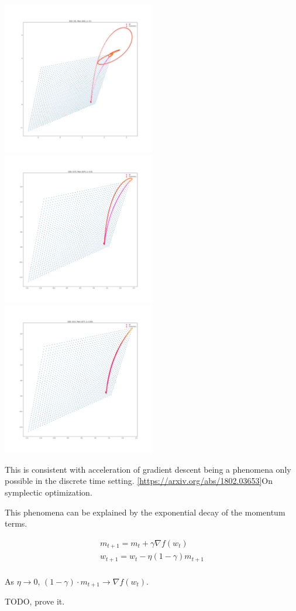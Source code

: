 \includegraphics[width=0.5\textwidth,height=0.5\textheight]{../../pictures/figures/vi_sgd-vs-vi_mom_01.png}
\includegraphics[width=0.5\textwidth,height=0.5\textheight]{../../pictures/figures/vi_sgd-vs-vi_mom_001.png}
\includegraphics[width=0.5\textwidth,height=0.5\textheight]{../../pictures/figures/vi_sgd-vs-vi_mom_0001.png}

This is consistent with acceleration of gradient descent being a
phenomena only possible in the discrete time setting.
\ref{https://arxiv.org/abs/1802.03653}{On symplectic optimization}.

This phenomena can be explained by the exponential decay of the momentum
terms.

\begin{align}
m_{t+1} = m_t + \gamma\nabla f(w_t) \\
w_{t+1} = w_t - \eta (1-\gamma) m_{t+1} \\
\end{align}

As \(\eta \to 0\), \((1-\gamma) \cdot m_{t+1} \to \nabla f(w_t)\).

TODO, prove it.
